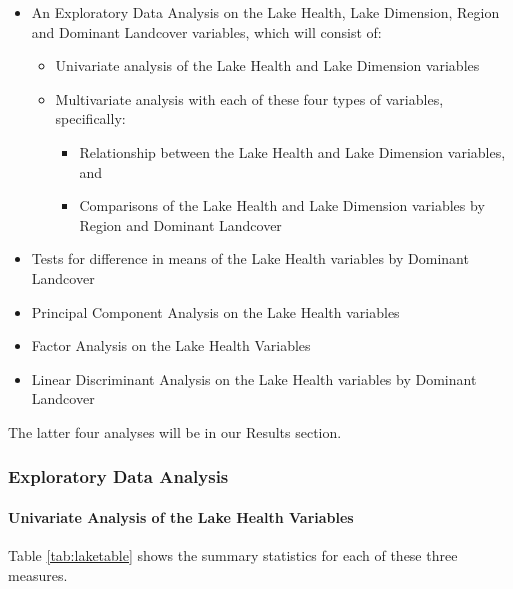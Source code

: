 \documentclass[
]{article}
\begin{document}
\begin{itemize}
\item
  An Exploratory Data Analysis on the Lake Health, Lake Dimension, Region and Dominant Landcover variables, which will consist of:

  \begin{itemize}
  \item
    Univariate analysis of the Lake Health and Lake Dimension variables
  \item
    Multivariate analysis with each of these four types of variables, specifically:

    \begin{itemize}
    \item
      Relationship between the Lake Health and Lake Dimension variables, and
    \item
      Comparisons of the Lake Health and Lake Dimension variables by Region and Dominant Landcover
    \end{itemize}
  \end{itemize}
\item
  Tests for difference in means of the Lake Health variables by Dominant Landcover
\item
  Principal Component Analysis on the Lake Health variables
\item
  Factor Analysis on the Lake Health Variables
\item
  Linear Discriminant Analysis on the Lake Health variables by Dominant Landcover
\end{itemize}

The latter four analyses will be in our Results section.

\hypertarget{exploratory-data-analysis}{%
\subsubsection{Exploratory Data Analysis}\label{exploratory-data-analysis}}

\hypertarget{univariate-analysis-of-the-lake-health-variables}{%
\paragraph{Univariate Analysis of the Lake Health Variables}\label{univariate-analysis-of-the-lake-health-variables}}

Table \ref{tab:laketable} shows the summary statistics for each of these three measures.
\end{document}
